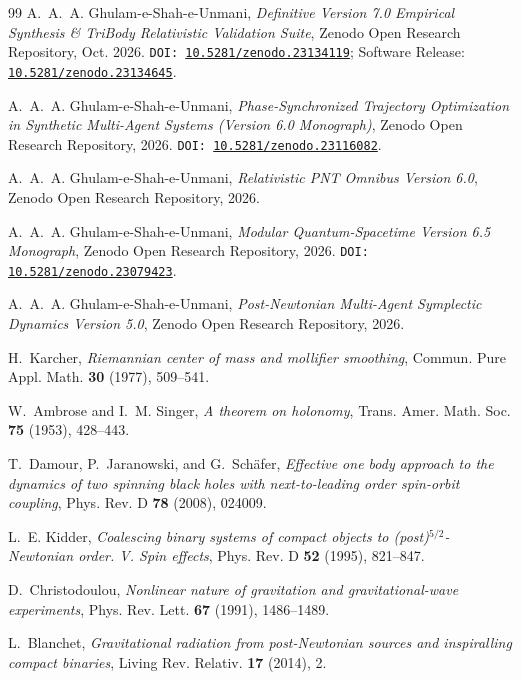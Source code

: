 \documentclass[11pt,a4paper,reqno]{article}
\theoremstyle{plain}
\theoremstyle{definition}
\theoremstyle{remark}
\numberwithin{equation}{section}
\begin{document}
\begin{thebibliography}{99}
A.~A.~A. Ghulam-e-Shah-e-Unmani, \emph{Definitive Version 7.0 Empirical Synthesis \& TriBody Relativistic Validation Suite}, Zenodo Open Research Repository, Oct. 2026. \texttt{DOI: \href{https://doi.org/10.5281/zenodo.23134119}{10.5281/zenodo.23134119}}; Software Release: \texttt{\href{https://doi.org/10.5281/zenodo.23134645}{10.5281/zenodo.23134645}}.

A.~A.~A. Ghulam-e-Shah-e-Unmani, \emph{Phase-Synchronized Trajectory Optimization in Synthetic Multi-Agent Systems (Version 6.0 Monograph)}, Zenodo Open Research Repository, 2026. \texttt{DOI: \href{https://doi.org/10.5281/zenodo.23116082}{10.5281/zenodo.23116082}}.

A.~A.~A. Ghulam-e-Shah-e-Unmani, \emph{Relativistic PNT Omnibus Version 6.0}, Zenodo Open Research Repository, 2026.

A.~A.~A. Ghulam-e-Shah-e-Unmani, \emph{Modular Quantum-Spacetime Version 6.5 Monograph}, Zenodo Open Research Repository, 2026. \texttt{DOI: \href{https://doi.org/10.5281/zenodo.23079423}{10.5281/zenodo.23079423}}.

A.~A.~A. Ghulam-e-Shah-e-Unmani, \emph{Post-Newtonian Multi-Agent Symplectic Dynamics Version 5.0}, Zenodo Open Research Repository, 2026.

H.~Karcher, \emph{Riemannian center of mass and mollifier smoothing}, Commun. Pure Appl. Math. \textbf{30} (1977), 509--541.

W.~Ambrose and I.~M. Singer, \emph{A theorem on holonomy}, Trans. Amer. Math. Soc. \textbf{75} (1953), 428--443.

T.~Damour, P.~Jaranowski, and G.~Sch\"afer, \emph{Effective one body approach to the dynamics of two spinning black holes with next-to-leading order spin-orbit coupling}, Phys. Rev. D \textbf{78} (2008), 024009.

L.~E. Kidder, \emph{Coalescing binary systems of compact objects to (post)$^{5/2}$-Newtonian order. V. Spin effects}, Phys. Rev. D \textbf{52} (1995), 821--847.

D.~Christodoulou, \emph{Nonlinear nature of gravitation and gravitational-wave experiments}, Phys. Rev. Lett. \textbf{67} (1991), 1486--1489.

L.~Blanchet, \emph{Gravitational radiation from post-Newtonian sources and inspiralling compact binaries}, Living Rev. Relativ. \textbf{17} (2014), 2.


\end{thebibliography}
\end{document}
